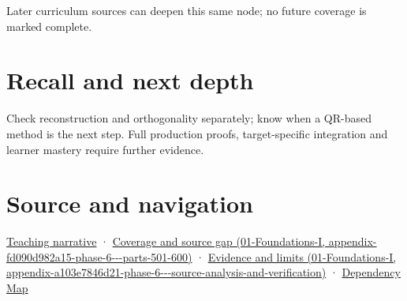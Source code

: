 Later curriculum sources can deepen this same node; no future coverage is marked complete.

\section{Recall and next depth}\label{appendix-c39f1ed34271-recall-and-next-depth}

Check reconstruction and orthogonality separately; know when a QR-based method is the next step. Full production proofs, target-specific integration and learner mastery require further evidence.

\section{Source and navigation}\label{appendix-c39f1ed34271-source-and-navigation}

\href{Continuous\%20Notes/Computing\%20Foundations\%20-\%20From\%20Bits\%20to\%20C++\%20and\%20Systems\%20APIs\#Orthonormal\%20frames\%20make\%20reconstruction\%20simple}{Teaching narrative} · \href{../01-Foundations-I/main.pdf\#nameddest=appendix-fd090d982a15-phase-6---parts-501-600}{Coverage and source gap (01-Foundations-I, appendix-fd090d982a15-phase-6-\/-\/-parts-501-600)} · \href{../01-Foundations-I/main.pdf\#nameddest=appendix-a103e7846d21-phase-6---source-analysis-and-verification}{Evidence and limits (01-Foundations-I, appendix-a103e7846d21-phase-6-\/-\/-source-analysis-and-verification)} · \hyperref[appendix-4ad47bdd269a]{Dependency Map}
